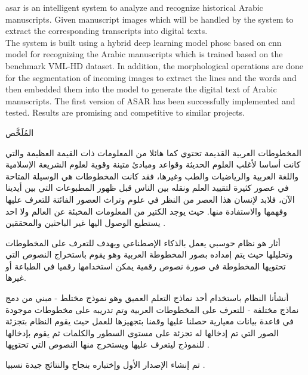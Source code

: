 \noindent
\acrfull{asar} is an intelligent system to analyze and recognize historical Arabic manuscripts. Given manuscript images which will be handled by the system to extract the corresponding transcripts into digital texts. \\ 

\noindent
The system is built using a hybrid deep learning model \acrfull{phosc} based on \acrfull{cnn} model for recognizing the Arabic manuscripts which is trained based on the benchmark VML-HD dataset. In addition, the morphological operations are done for the segmentation of incoming images to extract the lines and the words and then embedded them into the model to generate the digital text of Arabic manuscripts. The first version of ASAR has been successfully implemented and tested. Results are promising and competitive to similar projects.

\newpage

\begin{arabtext}
{\huge
المُلَخَّص
}\vspace{20pt}

المخطوطات العربية القديمة تحتوي كما هائلا من المعلومات ذات القيمة العظيمة والتي كانت أساسا لأغلب العلوم الحديثة وقواعد ومبادئ متينة وقوية لعلوم الشريعة الإسلامية واللغة العربية والرياضيات والطب وغيرها، فقد كانت المخطوطات هي الوسيلة المتاحة في عصور كثيرة لتقييد العلم ونقله بين الناس قبل ظهور المطبوعات التي بين أيدينا الآن، فلابد لإنسان هذا العصر من النظر في علوم وتراث العصور الفائتة للتعرف عليها وفهمها والاستفادة منها. حيث يوجد الكتير من المعلومات المخبئة عن العالم ولا احد يستطيع الوصول اليها غير الباحثين والمحققين .

\vspace{\baselineskip}

أثار هو نظام حوسبي يعمل بالذكاء الإصطناعي ويهدف للتعرف على المخطوطات وتحليلها حيث يتم إمداده بصور المخطوطة العربية وهو يقوم باستخراج النصوص التي تحتويها المخطوطة في صورة نصوص رقمية يمكن استخدامها رقميا في الطباعة أو غيرها.

\vspace{\baselineskip}

أنشأنا النظام باستخدام أحد نماذج التعلم العميق وهو نموذج مختلط - مبني من دمج نماذج مختلفة - للتعرف على المخطوطات العربية وتم تدريبه على مخطوطات موجودة في قاعدة بيانات معيارية حصلنا عليها وقمنا بتجهيزها للعمل حيث يقوم النظام بتجزئة الصور التي تم إدخالها له تجزئة على مستوى السطور والكلمات ثم يقوم بإدخالها للنموذج ليتعرف عليها ويستخرج منها النصوص التي تحتويِها .

 تم إنشاء الإصدار الأول وإختباره بنجاح والنتائج جيدة نسبيا .
\end{arabtext}
\newpage

